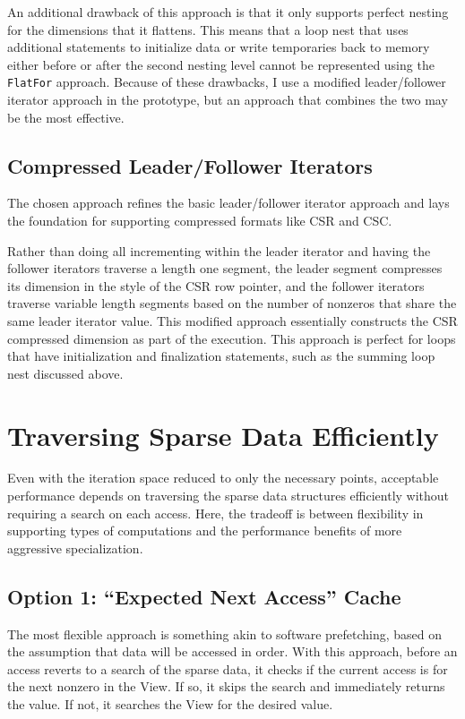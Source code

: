 An additional drawback of this approach is that it only supports perfect nesting for the dimensions that it flattens. 
This means that a loop nest that uses additional statements to initialize data or write temporaries back to memory either before or after the second nesting level cannot be represented using the \verb.FlatFor. approach.
Because of these drawbacks, I use a modified leader/follower iterator approach in the prototype, but an approach that combines the two may be the most effective.

\subsection{Compressed Leader/Follower Iterators}

The chosen approach refines the basic leader/follower iterator approach and lays the foundation for supporting compressed formats like CSR and CSC.

Rather than doing all incrementing within the leader iterator and having the follower iterators traverse a length one segment, the leader segment compresses its dimension in the style of the CSR row pointer, and the follower iterators traverse variable length segments based on the number of nonzeros that share the same leader iterator value.
This modified approach essentially constructs the CSR compressed dimension as part of the execution.
This approach is perfect for loops that have initialization and finalization statements, such as the summing loop nest discussed above. 


\section{Traversing Sparse Data Efficiently}\label{sec:SparseAccess}\label{sec:EfficientTraversal}

Even with the iteration space reduced to only the necessary points, acceptable performance depends on traversing the sparse data structures efficiently without requiring a search on each access.
Here, the tradeoff is between flexibility in supporting types of computations and the performance benefits of more aggressive specialization.

\subsection{Option 1: ``Expected Next Access'' Cache}

The most flexible approach is something akin to software prefetching, based on the assumption that data will be accessed in order. 
With this approach, before an access reverts to a search of the sparse data, it checks if the current access is for the next nonzero in the View.
If so, it skips the search and immediately returns the value.
If not, it searches the View for the desired value.


